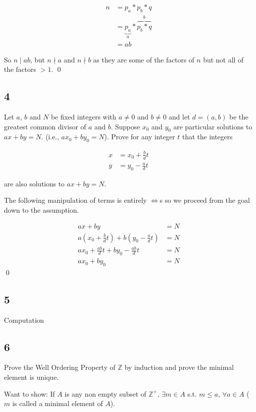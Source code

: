 \documentclass[12pt]{article}
\newcommand{\Z}{\mathbb{Z}}
\begin{document}
\begin{align*}
  n &= p_a * p_b * q \\
    &= \underbrace{p_a}_{a} * \overbrace{p_b * q}^{b} \\
    &= ab
\end{align*}

So $n \mid ab$, but $n \nmid a$ and $n \nmid b$ as they are some of the factors of $n$ but not all of the factors $> 1$. \qed{}

\subsection*{4}

Let $a$, $b$ and $N$ be fixed integers with $a \neq 0$ and $b \neq 0$ and let $d = (a, b)$ be the greatest common divisor of $a$ and $b$. Suppose $x_0$ and $y_0$ are particular solutions to $ax + by = N$.
(i.e., $ax_0 + by_0 = N$). Prove for any integer $t$ that the integers

\begin{align*}
  x &= x_0 + \frac{b}{d}t \\
  y &= y_0 - \frac{a}{d}t
\end{align*}

are also solutions to $ax + by = N$.

The following manipulation of terms is entirely $\iff$s so we proceed from the goal down to the assumption.

\begin{align*}
  ax + by &= N \\
  a(x_0 + \frac{b}{d}t) + b(y_0 - \frac{a}{d}t) &= N \\
  ax_0 + \frac{ab}{d}t + by_0 - \frac{ab}{d}t &= N \\
  ax_0 + by_0 &= N
\end{align*} \qed{}

\subsection*{5}

Computation

\subsection*{6}

Prove the Well Ordering Property of $\Z$ by induction and prove the minimal element is unique.

Want to show: If $A$ is any non empty subset of $\Z^+$, $\exists m \in A$ s.t. $m \leq a$, $\forall a \in A$ ($m$ is called a minimal element of $A$).
\end{document}
